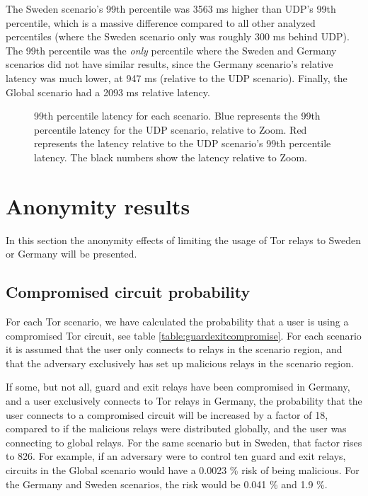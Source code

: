 \documentclass{kththesis}
\begin{document}
The Sweden scenario's 99th percentile was 3563 ms higher than UDP's 99th percentile, which is a massive difference compared to all other analyzed percentiles (where the Sweden scenario only was roughly 300 ms behind UDP). The 99th percentile was the \emph{only} percentile where the Sweden and Germany scenarios did not have similar results, since the Germany scenario's relative latency was much lower, at 947 ms (relative to the UDP scenario). Finally, the Global scenario had a 2093 ms relative latency.

\begin{figure}[!htb]
    \centering
    
    \caption{99th percentile latency for each scenario. Blue represents the 99th percentile latency for the UDP scenario, relative to Zoom. Red represents the latency relative to the UDP scenario's 99th percentile latency. The black numbers show the latency relative to Zoom.}
    \label{fig:99thPercentile}
\end{figure}

\section{Anonymity results}
In this section the anonymity effects of limiting the usage of Tor relays to Sweden or Germany will be presented.

\subsection{Compromised circuit probability}
For each Tor scenario, we have calculated the probability that a user is using a compromised Tor circuit, see table \ref{table:guardexitcompromise}. For each scenario it is assumed that the user only connects to relays in the scenario region, and that the adversary exclusively has set up malicious relays in the scenario region.

If some, but not all, guard and exit relays have been compromised in Germany, and a user exclusively connects to Tor relays in Germany, the probability that the user connects to a compromised circuit will be increased by a factor of 18, compared to if the malicious relays were distributed globally, and the user was connecting to global relays. For the same scenario but in Sweden, that factor rises to 826. For example, if an adversary were to control ten guard and exit relays, circuits in the Global scenario would have a 0.0023 \% risk of being malicious. For the Germany and Sweden scenarios, the risk would be 0.041 \% and 1.9 \%.
\end{document}
